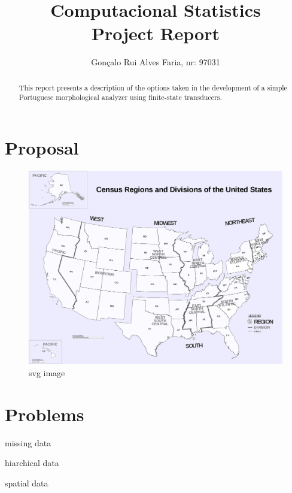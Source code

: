 \documentclass[acmsmall]{acmart}
\begin{document}
\title{Computacional Statistics \\ Project Report}

\author{Gonçalo Rui Alves Faria, nr: 97031}


\begin{abstract}
  This report presents a description of the options taken
  in the development of a simple Portuguese morphological
  analyzer using finite-state transducers.
\end{abstract}

\maketitle
\thispagestyle{empty}

\section{Proposal}
\begin{figure}
  \centering
  \includegraphics[scale=0.1]{regions.png}
  \caption{svg image}
\end{figure}

\section{Problems}

missing data

hiarchical data

spatial data
\end{document}
